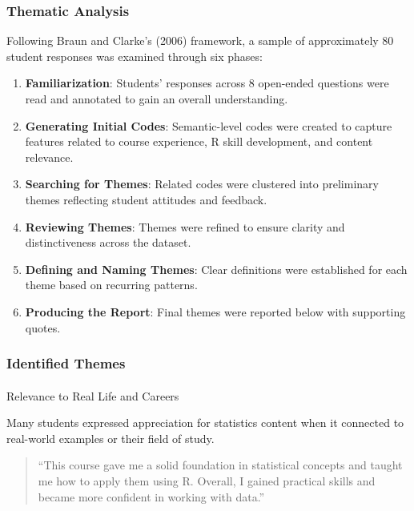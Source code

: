 \documentclass[
  letterpaper,
  DIV=11,
  numbers=noendperiod]{scrartcl}
\makeatletter
\let\oldparagraph\paragraph
\renewcommand{\paragraph}{
    \@ifstar
      \xxxParagraphStar
      \xxxParagraphNoStar
  }
\newcommand{\xxxParagraphStar}[1]{\oldparagraph*{#1}\mbox{}}
\newcommand{\xxxParagraphNoStar}[1]{\oldparagraph{#1}\mbox{}}
\makeatother
\begin{document}
\subsubsection{Thematic Analysis}\label{thematic-analysis}

Following Braun and Clarke's (2006) framework, a sample of approximately
80 student responses was examined through six phases:

\begin{enumerate}
\def\labelenumi{\arabic{enumi}.}
\item
  \textbf{Familiarization}: Students' responses across 8 open-ended
  questions were read and annotated to gain an overall understanding.
\item
  \textbf{Generating Initial Codes}: Semantic-level codes were created
  to capture features related to course experience, R skill development,
  and content relevance.
\item
  \textbf{Searching for Themes}: Related codes were clustered into
  preliminary themes reflecting student attitudes and feedback.
\item
  \textbf{Reviewing Themes}: Themes were refined to ensure clarity and
  distinctiveness across the dataset.
\item
  \textbf{Defining and Naming Themes}: Clear definitions were
  established for each theme based on recurring patterns.
\item
  \textbf{Producing the Report}: Final themes were reported below with
  supporting quotes.
\end{enumerate}

\subsubsection{Identified Themes}\label{identified-themes}

\paragraph{Relevance to Real Life and
Careers}\label{relevance-to-real-life-and-careers}

Many students expressed appreciation for statistics content when it
connected to real-world examples or their field of study.

\begin{quote}
``This course gave me a solid foundation in statistical concepts and
taught me how to apply them using R. Overall, I gained practical skills
and became more confident in working with data.''
\end{quote}
\end{document}
